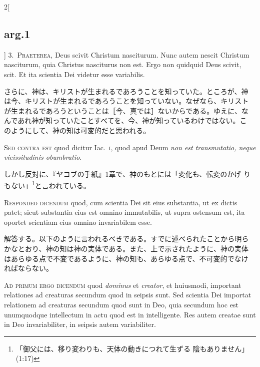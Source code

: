 \documentclass[paper=a4paper,fontsize=10pt,jafontsize=9pt,titlepage]{jlreq}
\begin{document}
\begin{paracol}{2}[\subsection{arg.1}]
{\scshape 3.~Praeterea}, Deus scivit Christum nasciturum. Nunc autem
nescit Christum nasciturum, quia Christus nasciturus non est. Ergo non
quidquid Deus scivit, scit. Et ita scientia Dei videtur esse
variabilis.

\switchcolumn

さらに、神は、キリストが生まれるであろうことを知っていた。ところが、神
は今、キリストが生まれるであろうことを知っていない。なぜなら、キリスト
が生まれるであろうということは［今、真では］ないからである。ゆえに、な
んであれ神が知っていたことすべてを、今、神が知っているわけではない。こ
のようにして、神の知は可変的だと思われる。

\switchcolumn*[\subsection{s.c.}]

{\scshape Sed contra est} quod dicitur Iac.~{\scshape i}, quod apud
Deum {\itshape non est transmutatio, neque vicissitudinis obumbratio}.

\switchcolumn

しかし反対に、『ヤコブの手紙』1章で、神のもとには「変化も、転変のかげ
りもない」\footnote{「御父には、移り変わりも、天体の動きにつれて生ずる
陰もありません」(1:17)}と言われている。


{\scshape Respondeo dicendum} quod, cum scientia Dei sit eius
substantia, ut ex dictis patet; sicut substantia eius est omnino
immutabilis, ut supra ostensum est, ita oportet scientiam eius omnino
invariabilem esse.

\switchcolumn

解答する。以下のように言われるべきである。すでに述べられたことから明ら
かなとおり、神の知は神の実体である。また、上で示されたように、神の実体
はあらゆる点で不変であるように、神の知も、あらゆる点で、不可変的でなけ
ればならない。

\switchcolumn*[\subsection{ad.1}]

{\scshape Ad primum ergo dicendum} quod {\itshape dominus} et
{\itshape creator}, et huiusmodi, important relationes ad creaturas
secundum quod in seipsis sunt. Sed scientia Dei importat relationem ad
creaturas secundum quod sunt in Deo, quia secundum hoc est unumquodque
intellectum in actu quod est in intelligente. Res autem creatae sunt
in Deo invariabiliter, in seipsis autem variabiliter.


\end{paracol}
\end{document}
